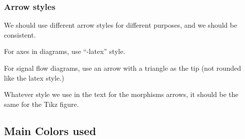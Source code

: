 \subsubsection*{Arrow styles}

We should use different arrow styles for different purposes,
and we should be consistent.

For axes in diagrams, use ``-latex'' style.

For signal flow diagrams, use an arrow with a triangle as the tip (not rounded like the latex style.)

Whatever style we use in the text for the morphisms arrows, it should be the same for the Tikz figure.

\vfill\pagebreak

\subsection{Main Colors used}

